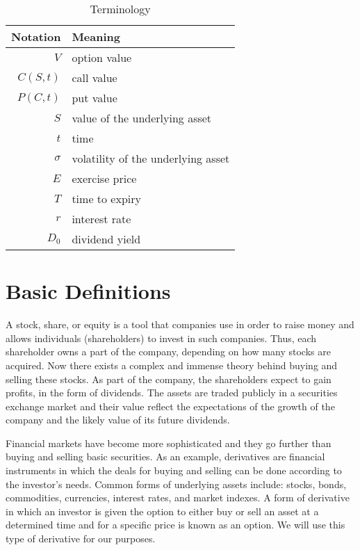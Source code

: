 \documentclass[00main.tex]{subfiles}
\begin{document}
\begin{table}
\centering
\begin{tabular}{r|l}
Notation & Meaning\\ \hline
 $V$ &  option value\\
 $C(S,t)$ & call value\\
 $P(C,t)$ & put value\\
 $S$ &  value of the underlying asset\\
 $t$ &  time\\
 $\sigma$ &  volatility of the underlying asset\\
 $E$ &  exercise price\\
 $T$ &  time to expiry\\
 $r$ &  interest rate\\
 $D_0$ & dividend yield
\end{tabular}
\caption{Terminology}
\label{terms}
\end{table}


\section{Basic Definitions}



A stock, share, or equity is a tool that companies use in order to raise money and allows individuals (shareholders) to invest in such companies. Thus, each shareholder owns a part of the company, depending on how many stocks are acquired. Now there exists a complex and immense theory behind buying and selling these stocks. As part of the company, the shareholders expect to gain profits, in the form of dividends. The assets are traded publicly in a securities exchange market and their value reflect the expectations of the growth of the company and the likely value of its future dividends. 

Financial markets have become more sophisticated and they go further than buying and selling basic securities. As an example, derivatives are financial instruments in which the deals for buying and selling can be done according to the investor's needs. Common forms of underlying assets include: stocks, bonds, commodities, currencies, interest rates, and market indexes. A form of derivative in which an investor is given the option to either buy or sell an asset at a determined time and for a specific price is known as an option. We will use this type of derivative for our purposes.
\end{document}
